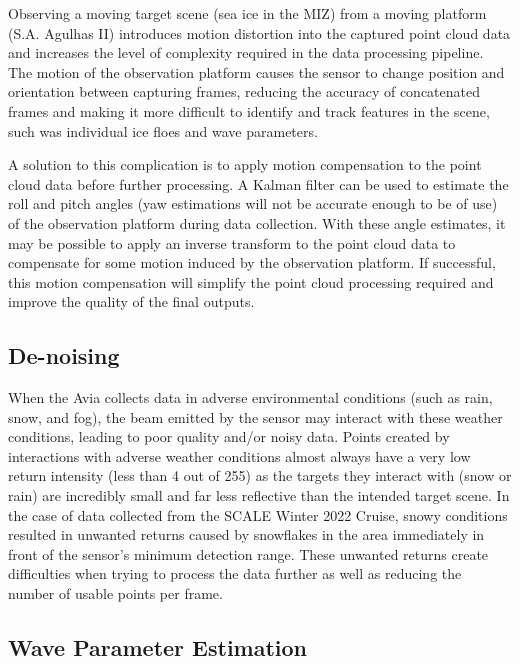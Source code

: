 Observing a moving target scene (sea ice in the \ac{MIZ}) from a moving platform (S.A. Agulhas II) introduces motion distortion into the captured point cloud data and increases the level of complexity required in the data processing pipeline. The motion of the observation platform causes the sensor to change position and orientation between capturing frames, reducing the accuracy of concatenated frames and making it more difficult to identify and track features in the scene, such was individual ice floes and wave parameters.

A solution to this complication is to apply motion compensation to the point cloud data before further processing. A Kalman filter can be used to estimate the roll and pitch angles (yaw estimations will not be accurate enough to be of use) of the observation platform during data collection. With these angle estimates, it may be possible to apply an inverse transform to the point cloud data to compensate for some motion induced by the observation platform. If successful, this motion compensation will simplify the point cloud processing required and improve the quality of the final outputs.

\subsection{De-noising}
\label{subsec:ch5.section3.subsec2}

When the Avia collects data in adverse environmental conditions (such as rain, snow, and fog), the beam emitted by the sensor may interact with these weather conditions, leading to poor quality and/or noisy data. Points created by interactions with adverse weather conditions almost always have a very low return intensity (less than 4 out of 255) as the targets they interact with (snow or rain) are incredibly small and far less reflective than the intended target scene. In the case of data collected from the \ac{SCALE} Winter 2022 Cruise, snowy conditions resulted in unwanted returns caused by snowflakes in the area immediately in front of the sensor's minimum detection range. These unwanted returns create difficulties when trying to process the data further as well as reducing the number of usable points per frame.

\subsection{Wave Parameter Estimation}
\label{subsec:ch5.section3.subsec3}

